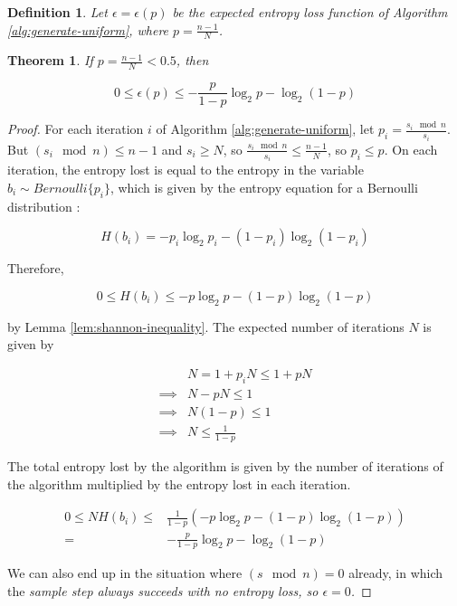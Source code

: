\documentclass[12pt]{article}
\newtheorem{definition}{Definition}
\newtheorem{theorem}{Theorem}
\begin{document}
\begin{definition}
    Let $\epsilon = \epsilon(p)$ be the expected entropy loss function of Algorithm \ref{alg:generate-uniform}, where $p=\frac{n-1}{N}$.
\end{definition}

\begin{theorem}
    \label{thm:loss}
If $p = \frac{n-1}{N} < 0.5$, then

\begin{equation}
0 \le \epsilon(p) \le -\frac{p}{1-p}\log_2p - \log_2(1-p)
\end{equation}

\end{theorem}

\begin{proof}
For each iteration $i$ of Algorithm \ref{alg:generate-uniform}, let $p_i = \frac{s_i \mod n}{s_i}$. But $(s_i \mod n) \le n-1$ and $s_i \ge N$, so $\frac{s_i \mod n}{s_i} \le \frac{n-1}{N}$, so $p_i \le p$. On each iteration, the entropy lost is equal to the entropy in the variable $b_i \sim Bernoulli\{p_i\}$, which is given by the entropy equation for a Bernoulli distribution \cite{cover1999elements}:

\begin{equation}
H(b_i) = -p_i\log_2p_i - (1-p_i)\log_2(1-p_i)
\end{equation}

Therefore, 

\begin{equation}
0 \le H(b_i) \le -p\log_2p - (1-p)\log_2(1-p) 
\end{equation}


by Lemma \ref{lem:shannon-inequality}. The expected number of iterations $N$ is given by

\begin{align}
& N = 1 + p_iN \le 1 + pN \\
\implies & N-pN \le 1 \\
\implies & N(1-p) \le 1 \\
\implies & N \le \frac{1}{1-p}
\end{align}

The total entropy lost by the algorithm is given by the number of iterations of the algorithm multiplied by the entropy lost in each iteration.

\begin{align}
0 \le NH(b_i) \le & \frac{1}{1-p}(-p\log_2p - (1-p)\log_2(1-p) ) \\
= & -\frac{p}{1-p}\log_2p - \log_2(1-p)
\end{align}

We can also end up in the situation where $(s \mod n) = 0$ already, in which the \em sample \em step always succeeds with no entropy loss, so $\epsilon=0$.
\end{proof}
\end{document}
